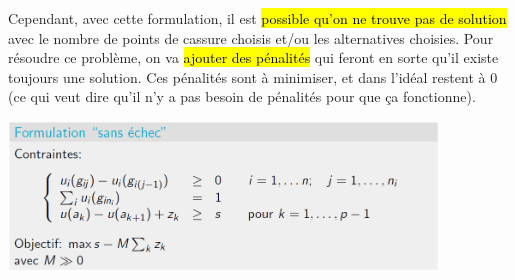 \documentclass[a4paper, 12pt]{article}
\newcommand{\alinea}{
\hspace*{0.5cm}}
\begin{document}
		\alinea Cependant, avec cette formulation, il est\hl{ possible qu'on ne trouve pas de solution} avec le nombre de points de cassure
			choisis et/ou les alternatives choisies. Pour résoudre ce problème, on va \hl{ajouter des pénalités} qui feront
			en sorte qu'il existe toujours une solution. Ces pénalités sont à minimiser, et dans l'idéal restent à 0 (ce qui veut
			dire qu'il n'y a pas besoin de pénalités pour que ça fonctionne).
		\begin{center}
			\includegraphics[width=4.5in]{Images/UTA2}
		\end{center}
\end{document}
